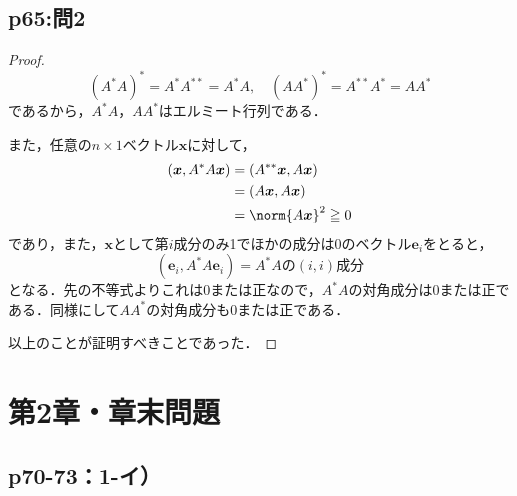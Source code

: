 \documentclass[uplatex,dvipdfmx,a4paper,10pt,fleqn]{jsarticle}
\begin{document}
    \subsection*{p65:問2}

\begin{tleftbar}
    \begin{proof}
    \[
        (A^\ast A)^{\ast} = A^{\ast} A^{\ast \ast} = A^{\ast} A, \quad (A A^{\ast})^\ast = A^{\ast \ast} A^\ast =A A^{\ast}
    \]
    であるから，$A^\ast A$，$A A^{\ast}$はエルミート行列である．

    また，任意の$n \times 1$ベクトル$\bm{x}$に対して，
    \begin{align*} 
        (\bm{x}, A^{\ast}A \bm{x}) & = (A^{\ast \ast} \bm{x}, A \bm{x}) \\
        & = (A \bm{x}, A \bm{x}) \\
        & = \norm{A \bm{x}}^2 \geqq 0
    \end{align*}
    であり，また，$\bm{x}$として第$i$成分のみ1でほかの成分は$0$のベクトル$\bm{e}_i$をとると，
    \[
        (\bm{e}_i, A^{\ast}A \bm{e}_i) = \text{$A^{\ast}A$の$(i,i)$成分}
    \]
    となる．先の不等式よりこれは$0$または正なので，$A^{\ast}A$の対角成分は$0$または正である．同様にして$AA^{\ast}$の対角成分も$0$または正である．

    以上のことが証明すべきことであった．
\end{proof}
\end{tleftbar}

    \newpage 
\section*{第2章・章末問題}


\subsection*{p70-73：1-イ）}
\end{document}

